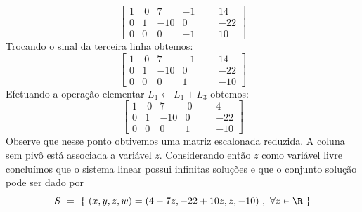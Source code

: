 \begin{solution}
$$ \left[\begin{array}{rrrrr|rr}
	1 & \ 0 &    7  &  -1   & & &   14      \\
	0 &   1 &  -10  &   0   & & &  -22      \\ 
	0 &   0 &    0  &  -1   & & &    10      \end{array}\right] $$
Trocando o sinal da terceira linha obtemos:
$$ \left[\begin{array}{rrrrr|rr}
	1 & \ 0 &    7  &  -1   & & &   14      \\
	0 &   1 &  -10  &   0   & & &  -22      \\ 
	0 &   0 &    0  &   1   & & &  -10      \end{array}\right] $$
Efetuando a operação elementar $L_1 \leftarrow L_1 + L_3$ obtemos:
$$ \left[\begin{array}{rrrrr|rr}
	1 & \ 0 &    7  & \ 0   & & &    4      \\
	0 &   1 &  -10  &   0   & & &  -22      \\ 
	0 &   0 &    0  &   1   & & &  -10      \end{array}\right] $$
Observe que nesse ponto obtivemos uma matriz escalonada reduzida. A coluna sem pivô está associada a variável $z$.
Considerando então $z$ como variável livre concluímos que o sistema linear possui infinitas soluções e que o conjunto solução pode ser dado por 
$$S\ =\ \{\ (x,y,z,w) = (4-7z , -22+10z , z , -10)\ , \ \forall z \in \R\ \}$$
\end{solution}

